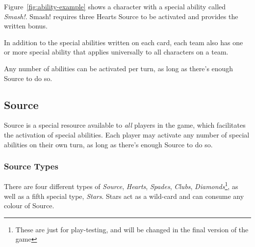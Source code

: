 Figure~\ref{fig:ability-example} shows a character with a special ability called \textit{Smash!}.
Smash! requires three Hearts Source to be activated and provides the written bonus.

In addition to the special abilities written on each card, each team also has one or more special ability that applies universally to all characters on a team.

\note Any number of abilities can be activated per turn, as long as there's enough Source to do so.
\subsection{Source}
Source is a special resource available to \textit{all} players in the game, which facilitates the activation of special abilities. Each player may activate any number of special abilities on their own turn, as long as there's enough Source to do so.

\subsubsection{Source Types}
There are four different types of \textit{Source}, \textit{Hearts}, \textit{Spades}, \textit{Clubs}, \textit{Diamonds}\footnote{These are just for play-testing, and will be changed in the final version of the game}, as well as a fifth special type, \textit{Stars}.
Stars act as a wild-card and can consume any colour of Source.

